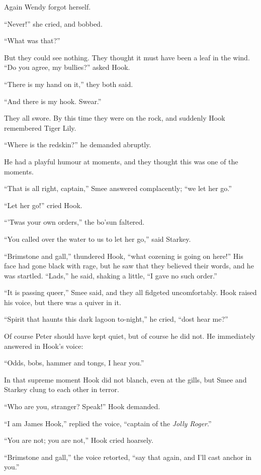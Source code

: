 Again Wendy forgot herself.

``Never!'' she cried, and bobbed.

``What was that?''

But they could see nothing. They thought it must have been a leaf in
the wind. ``Do you agree, my bullies?'' asked Hook.

``There is my hand on it,'' they both said.

``And there is my hook. Swear.''

They all swore. By this time they were on the rock, and suddenly Hook
remembered Tiger Lily.

``Where is the redskin?'' he demanded abruptly.

He had a playful humour at moments, and they thought this was one of
the moments.

``That is all right, captain,'' Smee answered complacently; ``we let her
go.''

``Let her go!'' cried Hook.

``'Twas your own orders,'' the bo'sun faltered.

``You called over the water to us to let her go,'' said Starkey.

``Brimstone and gall,'' thundered Hook, ``what cozening is going on here!''
His face had gone black with rage, but he saw that they believed their
words, and he was startled. ``Lads,'' he said, shaking a little, ``I gave
no such order.''

``It is passing queer,'' Smee said, and they all fidgeted uncomfortably.
Hook raised his voice, but there was a quiver in it.

``Spirit that haunts this dark lagoon to-night,'' he cried, ``dost hear
me?''

Of course Peter should have kept quiet, but of course he did not. He
immediately answered in Hook's voice:

``Odds, bobs, hammer and tongs, I hear you.''

In that supreme moment Hook did not blanch, even at the gills, but Smee
and Starkey clung to each other in terror.

``Who are you, stranger? Speak!'' Hook demanded.

``I am James Hook,'' replied the voice, ``captain of the \emph{Jolly Roger}.''

``You are not; you are not,'' Hook cried hoarsely.

``Brimstone and gall,'' the voice retorted, ``say that again, and I'll
cast anchor in you.''

